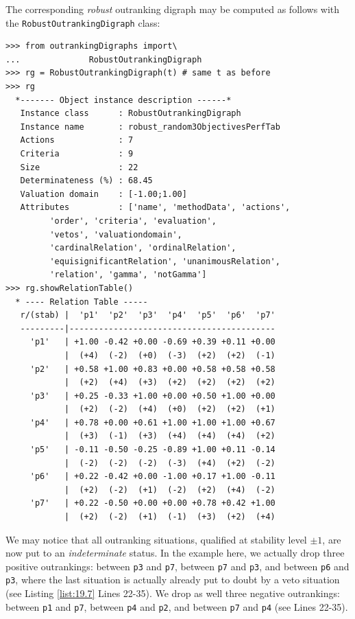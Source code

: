The corresponding \emph{robust} outranking digraph may be computed as follows with the \texttt{RobustOutrankingDigraph} class:
\begin{lstlisting}[caption={Computing a robust outranking digraph},label=list:19.7]
>>> from outrankingDigraphs import\
...              RobustOutrankingDigraph
>>> rg = RobustOutrankingDigraph(t) # same t as before
>>> rg
  *------- Object instance description ------*
   Instance class      : RobustOutrankingDigraph
   Instance name       : robust_random3ObjectivesPerfTab
   Actions             : 7
   Criteria            : 9
   Size                : 22
   Determinateness (%) : 68.45
   Valuation domain    : [-1.00;1.00]
   Attributes          : ['name', 'methodData', 'actions',
         'order', 'criteria', 'evaluation',
         'vetos', 'valuationdomain',
         'cardinalRelation', 'ordinalRelation',
         'equisignificantRelation', 'unanimousRelation',
         'relation', 'gamma', 'notGamma']
>>> rg.showRelationTable()
  * ---- Relation Table -----
   r/(stab) |  'p1'  'p2'  'p3'  'p4'  'p5'  'p6'  'p7'   
   ---------|------------------------------------------
     'p1'   | +1.00 -0.42 +0.00 -0.69 +0.39 +0.11 +0.00  
            |  (+4)  (-2)  (+0)  (-3)  (+2)  (+2)  (-1)  
     'p2'   | +0.58 +1.00 +0.83 +0.00 +0.58 +0.58 +0.58  
            |  (+2)  (+4)  (+3)  (+2)  (+2)  (+2)  (+2)  
     'p3'   | +0.25 -0.33 +1.00 +0.00 +0.50 +1.00 +0.00  
            |  (+2)  (-2)  (+4)  (+0)  (+2)  (+2)  (+1)  
     'p4'   | +0.78 +0.00 +0.61 +1.00 +1.00 +1.00 +0.67  
            |  (+3)  (-1)  (+3)  (+4)  (+4)  (+4)  (+2)  
     'p5'   | -0.11 -0.50 -0.25 -0.89 +1.00 +0.11 -0.14  
            |  (-2)  (-2)  (-2)  (-3)  (+4)  (+2)  (-2)  
     'p6'   | +0.22 -0.42 +0.00 -1.00 +0.17 +1.00 -0.11  
            |  (+2)  (-2)  (+1)  (-2)  (+2)  (+4)  (-2)  
     'p7'   | +0.22 -0.50 +0.00 +0.00 +0.78 +0.42 +1.00  
            |  (+2)  (-2)  (+1)  (-1)  (+3)  (+2)  (+4)  
\end{lstlisting}
We may notice that all outranking situations, qualified at stability level $\pm 1$, are now put to an \emph{indeterminate} status. In the example here, we actually drop three positive outrankings: between \texttt{p3} and \texttt{p7}, between \texttt{p7} and \texttt{p3}, and between \texttt{p6} and \texttt{p3}, where the last situation is actually already put to doubt by a veto situation (see Listing \ref{list:19.7} Lines 22-35). We drop as well three negative outrankings: between \texttt{p1} and \texttt{p7}, between \texttt{p4} and \texttt{p2}, and between \texttt{p7} and \texttt{p4} (see Lines 22-35).

